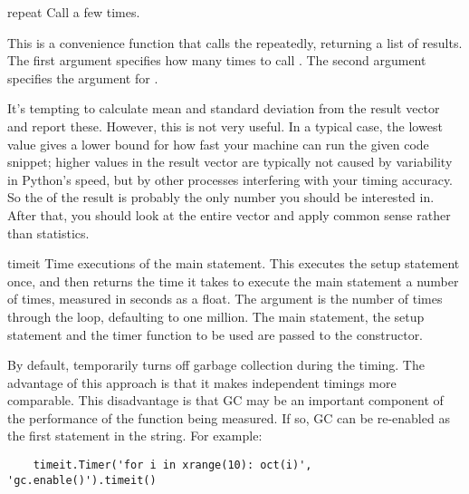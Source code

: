 \begin{methoddesc}{repeat}{}
Call  a few times.

This is a convenience function that calls the 
repeatedly, returning a list of results.  The first argument specifies
how many times to call .  The second argument
specifies the  argument for .

\begin{notice}
It's tempting to calculate mean and standard deviation from the result
vector and report these.  However, this is not very useful.  In a typical
case, the lowest value gives a lower bound for how fast your machine can run
the given code snippet; higher values in the result vector are typically not
caused by variability in Python's speed, but by other processes interfering
with your timing accuracy.  So the  of the result is
probably the only number you should be interested in.  After that, you
should look at the entire vector and apply common sense rather than
statistics.
\end{notice}
\end{methoddesc}

\begin{methoddesc}{timeit}{}
Time  executions of the main statement.
This executes the setup statement once, and then
returns the time it takes to execute the main statement a number of
times, measured in seconds as a float.  The argument is the number of
times through the loop, defaulting to one million.  The main
statement, the setup statement and the timer function to be used are
passed to the constructor.

\begin{notice}
By default,  temporarily turns off garbage collection
during the timing.  The advantage of this approach is that it makes
independent timings more comparable.  This disadvantage is that GC
may be an important component of the performance of the function being
measured.  If so, GC can be re-enabled as the first statement in the
 string.  For example:
\begin{verbatim}
    timeit.Timer('for i in xrange(10): oct(i)', 'gc.enable()').timeit()
\end{verbatim}
\end{notice}
\end{methoddesc}


